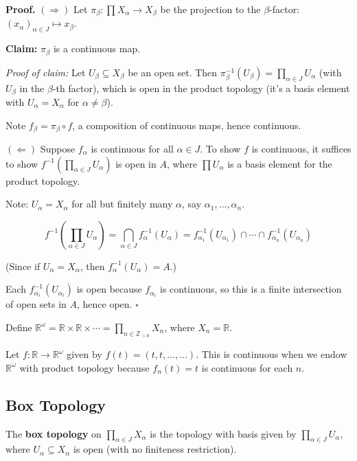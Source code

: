 \documentclass[11pt]{report}
\renewenvironment{proof}[1][Proof]{\noindent\textbf{#1.} }{\hfill$\square$\par\vspace{5pt}}
\begin{document}
\begin{proof}
$(\Rightarrow)$ Let $\pi_\beta: \prod X_\alpha \to X_\beta$ be the projection to the $\beta$-factor: $(x_\alpha)_{\alpha \in J} \mapsto x_\beta$.

\textbf{Claim:} $\pi_\beta$ is a continuous map.

\textit{Proof of claim:} Let $U_\beta \subseteq X_\beta$ be an open set. Then $\pi_\beta^{-1}(U_\beta) = \prod_{\alpha \in J} U_\alpha$ (with $U_\beta$ in the $\beta$-th factor), which is open in the product topology (it's a basis element with $U_\alpha = X_\alpha$ for $\alpha \neq \beta$).

Note $f_\beta = \pi_\beta \circ f$, a composition of continuous maps, hence continuous.

$(\Leftarrow)$ Suppose $f_\alpha$ is continuous for all $\alpha \in J$. To show $f$ is continuous, it suffices to show $f^{-1}(\prod_{\alpha \in J} U_\alpha)$ is open in $A$, where $\prod U_\alpha$ is a basis element for the product topology.

Note: $U_\alpha = X_\alpha$ for all but finitely many $\alpha$, say $\alpha_1, \ldots, \alpha_n$.

\[f^{-1}\left(\prod_{\alpha \in J} U_\alpha\right) = \bigcap_{\alpha \in J} f_\alpha^{-1}(U_\alpha) = f_{\alpha_1}^{-1}(U_{\alpha_1}) \cap \cdots \cap f_{\alpha_n}^{-1}(U_{\alpha_n})\]

(Since if $U_\alpha = X_\alpha$, then $f_\alpha^{-1}(U_\alpha) = A$.)

Each $f_{\alpha_i}^{-1}(U_{\alpha_i})$ is open because $f_{\alpha_i}$ is continuous, so this is a finite intersection of open sets in $A$, hence open.
\end{proof}

\begin{exbox}
Define $\mathbb{R}^\omega = \mathbb{R} \times \mathbb{R} \times \cdots = \prod_{n \in \mathbb{Z}_{>0}} X_n$, where $X_n = \mathbb{R}$.

Let $f: \mathbb{R} \to \mathbb{R}^\omega$ given by $f(t) = (t, t, \ldots, \ldots)$. This is continuous when we endow $\mathbb{R}^\omega$ with product topology because $f_n(t) = t$ is continuous for each $n$.
\end{exbox}

\subsection{Box Topology}

\begin{defbox}
The \textbf{box topology} on $\prod_{\alpha \in J} X_\alpha$ is the topology with basis given by $\prod_{\alpha \in J} U_\alpha$, where $U_\alpha \subseteq X_\alpha$ is open (with no finiteness restriction).
\end{defbox}
\end{document}
